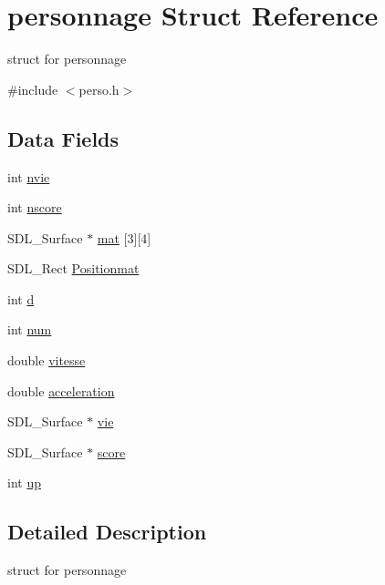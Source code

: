 \hypertarget{structpersonnage}{}\section{personnage Struct Reference}
\label{structpersonnage}


struct for personnage  




{\ttfamily \#include $<$perso.\+h$>$}

\subsection*{Data Fields}
\begin{DoxyCompactItemize}
\item 
int \hyperlink{structpersonnage_a5f78a81264a0d479a023826b20b86173}{nvie}
\item 
int \hyperlink{structpersonnage_a6c5c952d4dc96ed7f6be22480cb5a4d0}{nscore}
\item 
S\+D\+L\+\_\+\+Surface $\ast$ \hyperlink{structpersonnage_a7e7c398ea690ec57a5fce13c80386cd4}{mat} \mbox{[}3\mbox{]}\mbox{[}4\mbox{]}
\item 
S\+D\+L\+\_\+\+Rect \hyperlink{structpersonnage_a8216e2ba9fa8840fd13e47f40ccf356d}{Positionmat}
\item 
int \hyperlink{structpersonnage_ad3316ca5e21971af05da3b10b0d18fb3}{d}
\item 
int \hyperlink{structpersonnage_acfac32928075716cc10265cfc9f551fc}{num}
\item 
double \hyperlink{structpersonnage_a9833848acdb28a307902c8e1682213d9}{vitesse}
\item 
double \hyperlink{structpersonnage_aa3dc1bee3cdaa742eac0d46f56ac8908}{acceleration}
\item 
S\+D\+L\+\_\+\+Surface $\ast$ \hyperlink{structpersonnage_a3a476ed3aa74ef4eb7ea482739443401}{vie}
\item 
S\+D\+L\+\_\+\+Surface $\ast$ \hyperlink{structpersonnage_ad1416e47a9921f214b01e8435d2ea476}{score}
\item 
int \hyperlink{structpersonnage_ad781b14c9d0a4f927e6471b9cf1234df}{up}
\end{DoxyCompactItemize}


\subsection{Detailed Description}
struct for personnage 

